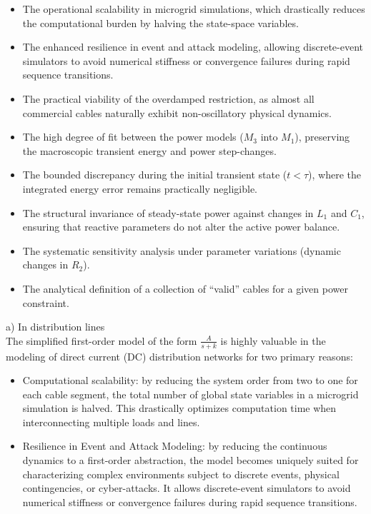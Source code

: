 \documentclass[energies,accept,oneauthor,pdftex]{Definitions/mdpi}
\begin{document}
\begin{itemize}
    \item {The operational scalability in microgrid simulations,} which drastically reduces the computational burden by halving the state-space variables.
    \item {The enhanced resilience in event and attack modeling,} allowing discrete-event simulators to avoid numerical stiffness or convergence failures during rapid sequence transitions.
    \item {The practical viability of the overdamped restriction,} as almost all commercial cables naturally exhibit non-oscillatory physical dynamics.
    \item {The high degree of fit between the power models ($M_3$ into $M_1$),} preserving the macroscopic transient energy and power step-changes.
    \item {The bounded discrepancy during the initial transient state ($t < \tau$),} where the integrated energy error remains practically negligible.
    \item {The structural invariance of steady-state power against changes in $L_1$ and $C_1$,} ensuring that reactive parameters do not alter the active power balance.
    \item {The systematic sensitivity analysis under parameter variations (dynamic changes in $R_2$).}
    \item {The analytical definition of a collection of ``valid'' cables for a given power constraint.}
\end{itemize}



\medskip\noindent
a) In distribution lines \\
The simplified first-order model of the form $\frac{A}{s+k}$ is highly valuable in the modeling of direct current (DC) distribution networks for two primary reasons:
\begin{itemize}
\item Computational scalability: by reducing the system order from two to one for each cable segment, the total number of global state variables in a microgrid simulation is halved. This drastically optimizes computation time when interconnecting multiple loads and lines.

\item Resilience in Event and Attack Modeling: by reducing the continuous dynamics to a first-order abstraction, the model becomes uniquely suited for characterizing complex environments subject to discrete events, physical contingencies, or cyber-attacks. It allows discrete-event simulators to avoid numerical stiffness or convergence failures during rapid sequence transitions.


\end{itemize}
\end{document}
